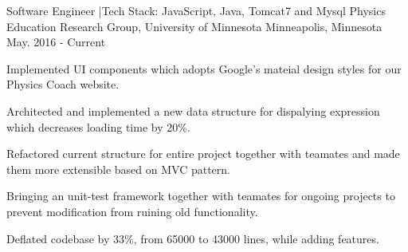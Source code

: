 

\begin{cventries}

  \cventry
    {Software Engineer \enskip|\enskip Tech Stack: JavaScript, Java, Tomcat7 and Mysql} %
    {Physics Education Research Group, University of Minnesota} %
    {Minneapolis, Minnesota} %
    {May. 2016 - Current} %
    {
      \begin{cvitems} %
        \item {Implemented UI components which adopts Google's mateial design styles for our Physics Coach website.}
        \item{Architected and implemented a new data structure for dispalying expression  which decreases loading time by 20\%.}
        \item{Refactored current structure for entire project together with teamates and made them more extensible based on MVC pattern.}
        \item{Bringing an unit-test framework together with teamates for ongoing projects to prevent modification from ruining old functionality.}
        \item{Deflated codebase by 33\%, from 65000 to 43000 lines, while adding features.}
      \end{cvitems}
    }

\end{cventries}
